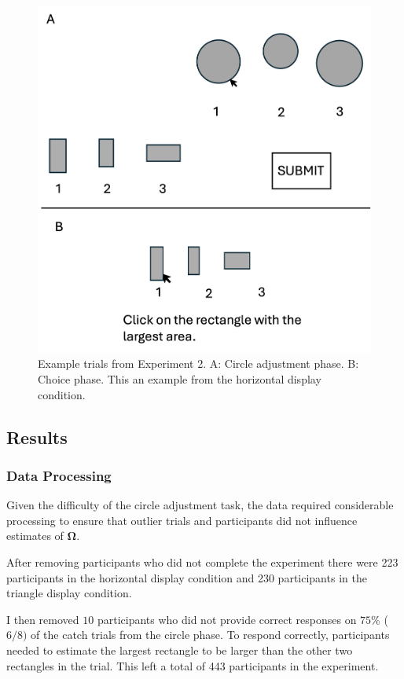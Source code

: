 \begin{figure}
   \includegraphics[width=\linewidth]{figures/circle_exp_display.jpg}
   \caption{Example trials from Experiment 2. A: Circle adjustment phase. B: Choice phase. This an example from the horizontal display condition.}
   \label{fig:circle_exp_display}
\end{figure}

\subsection{Results}
\subsubsection{Data Processing}

Given the difficulty of the circle adjustment task, the data required considerable processing to ensure that outlier trials and participants did not influence estimates of $\mathbf{\Omega}$.

After removing participants who did not complete the experiment there were 223 participants in the horizontal display condition and 230 participants in the triangle display condition. 

I then removed $10$ participants who did not provide correct responses on $75\%$ ($6/8)$ of the catch trials from the circle phase. To respond correctly, participants needed to estimate the largest rectangle to be larger than the other two rectangles in the trial. This left a total of 443 participants in the experiment.

